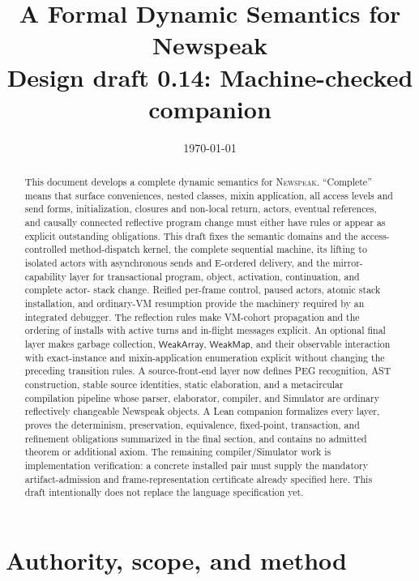 \documentclass[11pt]{article}
\title{A Formal Dynamic Semantics for Newspeak\\\large Design draft 0.14: Machine-checked companion}
\author{}
\date{\today}
\numberwithin{equation}{section}
\newcommand{\NS}{\textsc{Newspeak}}
\newcommand{\kw}[1]{\ensuremath{\mathsf{#1}}}
\begin{document}
\maketitle

\begin{abstract}
This document develops a complete dynamic semantics for \NS.  ``Complete''
means that surface conveniences, nested classes, mixin application, all access
levels and send forms, initialization, closures and non-local return, actors,
eventual references, and causally connected reflective program change must
either have rules or appear as explicit outstanding obligations.  This
draft fixes the semantic domains and the access-controlled method-dispatch
kernel, the complete sequential machine, its lifting to isolated actors with
asynchronous sends and E-ordered delivery, and the mirror-capability layer for
transactional program, object, activation, continuation, and complete actor-
stack change.  Reified per-frame control, paused actors, atomic stack
installation, and ordinary-VM resumption provide the machinery required by an
integrated debugger.  The reflection rules make VM-cohort propagation and the ordering of installs with
active turns and in-flight messages explicit.  An optional final layer makes
garbage collection, \kw{WeakArray}, \kw{WeakMap}, and their observable
interaction with exact-instance and mixin-application enumeration explicit
without changing the preceding transition rules.  A source-front-end layer
now defines PEG recognition, AST construction, stable source identities,
static elaboration, and a metacircular compilation pipeline whose parser,
elaborator, compiler, and Simulator are ordinary reflectively changeable
Newspeak objects.  A Lean companion formalizes every layer, proves the
determinism, preservation, equivalence, fixed-point, transaction, and
refinement obligations summarized in the final section, and contains no
admitted theorem or additional axiom.  The remaining compiler/Simulator work
is implementation verification: a concrete installed pair must supply the
mandatory artifact-admission and frame-representation certificate already
specified here.
This draft intentionally does not replace the language specification yet.
\end{abstract}

\clearpage
\begingroup
\footnotesize
\tableofcontents
\endgroup
\clearpage

\section{Authority, scope, and method}
\end{document}
